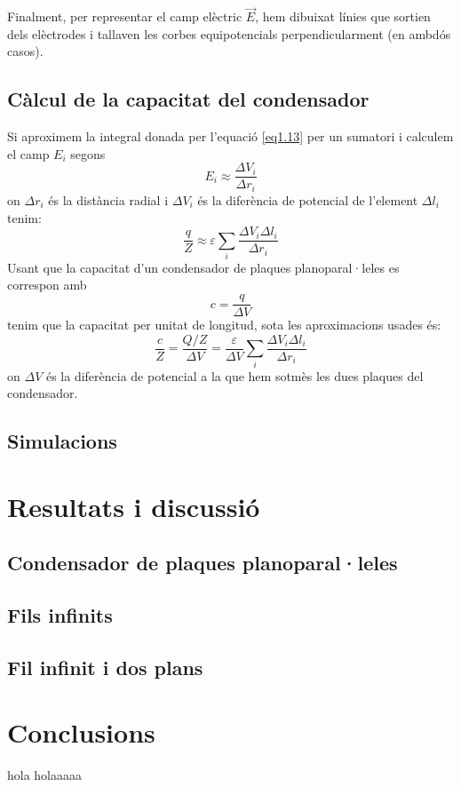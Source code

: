 \documentclass[a4paper,10.5pt]{report}
\begin{document}
	Finalment, per representar el camp elèctric $\vec{E}$, hem dibuixat línies que sortien dels elèctrodes i tallaven les corbes equipotencials perpendicularment (en ambdós casos). 
	
	\subsection{Càlcul de la capacitat del condensador}
	Si aproximem la integral donada per l'equació \eqref{eq1.13} per un sumatori i calculem el camp $E_i$ segons
	\begin{equation}
		E_i \approx \frac{\Delta V_i}{\Delta r_i}
	\end{equation}
	on $\Delta r_i$ és la distància radial i $\Delta V_i$ és la diferència de potencial de l'element $\Delta l_i$ tenim:
	\begin{equation}
		\frac{q}{Z} \approx \varepsilon \sum_i \frac{\Delta V_i \Delta l_i}{\Delta r_i}
	\end{equation}
	Usant que la capacitat d'un condensador de plaques planoparal·leles es correspon amb 
	\begin{equation}
		c = \frac{q}{\Delta V}
	\end{equation}
	tenim que la capacitat per unitat de longitud, sota les aproximacions usades és:
	\begin{equation}
		\frac{c}{Z} = \frac{Q/Z}{\Delta V} = \frac{\varepsilon}{\Delta V} \sum_i \frac{\Delta V_i \Delta l_i}{\Delta r_i}  
	\end{equation}
	on $\Delta V$ és la diferència de potencial a la que hem sotmès les dues plaques del condensador.
	
	\subsection{Simulacions}
	\section{Resultats i discussió}
	
	\subsection{Condensador de plaques planoparal·leles}
	
	\subsection{Fils infinits}

	\subsection{Fil infinit i dos plans}
	
	\section{Conclusions}
	hola
	holaaaaa
\end{document}
